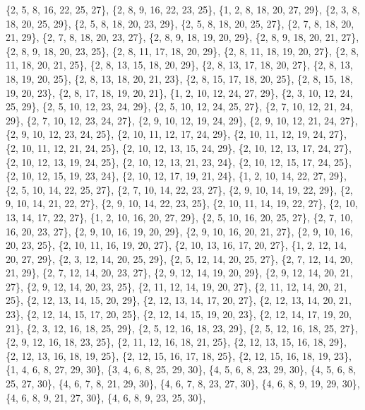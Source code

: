 \documentclass[11pt,a4paper]{article}
\begin{document}
{\{2, 5, 8, 16, 22, 25, 27\}, \{2, 8, 9, 16, 22, 23, 25\}, \{1, 2, 8, 18, 20, 27, 29\}, \{2, 3, 8, 18, 20, 25, 29\}, \{2, 5, 8, 18, 20, 23, 29\},
\{2, 5, 8, 18, 20, 25, 27\}, \{2, 7, 8, 18, 20, 21, 29\}, \{2, 7, 8, 18, 20, 23, 27\}, \{2, 8, 9, 18, 19, 20, 29\}, \{2, 8, 9, 18, 20, 21, 27\},
\{2, 8, 9, 18, 20, 23, 25\}, \{2, 8, 11, 17, 18, 20, 29\}, \{2, 8, 11, 18, 19, 20, 27\}, \{2, 8, 11, 18, 20, 21, 25\}, \{2, 8, 13, 15, 18, 20, 29\},
\{2, 8, 13, 17, 18, 20, 27\}, \{2, 8, 13, 18, 19, 20, 25\}, \{2, 8, 13, 18, 20, 21, 23\}, \{2, 8, 15, 17, 18, 20, 25\}, \{2, 8, 15, 18, 19, 20, 23\},
\{2, 8, 17, 18, 19, 20, 21\}, \{1, 2, 10, 12, 24, 27, 29\}, \{2, 3, 10, 12, 24, 25, 29\}, \{2, 5, 10, 12, 23, 24, 29\}, \{2, 5, 10, 12, 24, 25, 27\},
\{2, 7, 10, 12, 21, 24, 29\}, \{2, 7, 10, 12, 23, 24, 27\}, \{2, 9, 10, 12, 19, 24, 29\}, \{2, 9, 10, 12, 21, 24, 27\}, \{2, 9, 10, 12, 23, 24, 25\},
\{2, 10, 11, 12, 17, 24, 29\}, \{2, 10, 11, 12, 19, 24, 27\}, \{2, 10, 11, 12, 21, 24, 25\}, \{2, 10, 12, 13, 15, 24, 29\}, \{2, 10, 12, 13, 17, 24, 27\},
\{2, 10, 12, 13, 19, 24, 25\}, \{2, 10, 12, 13, 21, 23, 24\}, \{2, 10, 12, 15, 17, 24, 25\}, \{2, 10, 12, 15, 19, 23, 24\}, \{2, 10, 12, 17, 19, 21, 24\},
\{1, 2, 10, 14, 22, 27, 29\}, \{2, 5, 10, 14, 22, 25, 27\}, \{2, 7, 10, 14, 22, 23, 27\}, \{2, 9, 10, 14, 19, 22, 29\}, \{2, 9, 10, 14, 21, 22, 27\},
\{2, 9, 10, 14, 22, 23, 25\}, \{2, 10, 11, 14, 19, 22, 27\}, \{2, 10, 13, 14, 17, 22, 27\}, \{1, 2, 10, 16, 20, 27, 29\}, \{2, 5, 10, 16, 20, 25, 27\},
\{2, 7, 10, 16, 20, 23, 27\}, \{2, 9, 10, 16, 19, 20, 29\}, \{2, 9, 10, 16, 20, 21, 27\}, \{2, 9, 10, 16, 20, 23, 25\}, \{2, 10, 11, 16, 19, 20, 27\},
\{2, 10, 13, 16, 17, 20, 27\}, \{1, 2, 12, 14, 20, 27, 29\}, \{2, 3, 12, 14, 20, 25, 29\}, \{2, 5, 12, 14, 20, 25, 27\}, \{2, 7, 12, 14, 20, 21, 29\},
\{2, 7, 12, 14, 20, 23, 27\}, \{2, 9, 12, 14, 19, 20, 29\}, \{2, 9, 12, 14, 20, 21, 27\}, \{2, 9, 12, 14, 20, 23, 25\}, \{2, 11, 12, 14, 19, 20, 27\},
\{2, 11, 12, 14, 20, 21, 25\}, \{2, 12, 13, 14, 15, 20, 29\}, \{2, 12, 13, 14, 17, 20, 27\}, \{2, 12, 13, 14, 20, 21, 23\}, \{2, 12, 14, 15, 17, 20, 25\},
\{2, 12, 14, 15, 19, 20, 23\}, \{2, 12, 14, 17, 19, 20, 21\}, \{2, 3, 12, 16, 18, 25, 29\}, \{2, 5, 12, 16, 18, 23, 29\}, \{2, 5, 12, 16, 18, 25, 27\},
\{2, 9, 12, 16, 18, 23, 25\}, \{2, 11, 12, 16, 18, 21, 25\}, \{2, 12, 13, 15, 16, 18, 29\}, \{2, 12, 13, 16, 18, 19, 25\}, \{2, 12, 15, 16, 17, 18, 25\},
\{2, 12, 15, 16, 18, 19, 23\}, \{1, 4, 6, 8, 27, 29, 30\}, \{3, 4, 6, 8, 25, 29, 30\}, \{4, 5, 6, 8, 23, 29, 30\}, \{4, 5, 6, 8, 25, 27, 30\},
\{4, 6, 7, 8, 21, 29, 30\}, \{4, 6, 7, 8, 23, 27, 30\}, \{4, 6, 8, 9, 19, 29, 30\}, \{4, 6, 8, 9, 21, 27, 30\}, \{4, 6, 8, 9, 23, 25, 30\},
}
\end{document}
